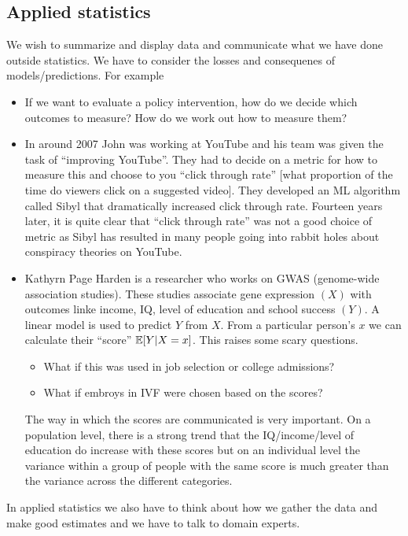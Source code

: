 \subsection{Applied statistics}
We wish to summarize and display data and communicate what we have done outside statistics. We have to consider the losses and consequenes of models/predictions. For example
\begin{itemize}
    \item If we want to evaluate a policy intervention, how do we decide which outcomes to measure? How do we work out how to measure them?
    \item In around 2007 John was working at YouTube and his team was given the task of ``improving YouTube''. They had to decide on a metric for how to measure this and choose to you ``click through rate'' [what proportion of the time do viewers click on a suggested video]. They developed an ML algorithm called Sibyl that dramatically increased click through rate. Fourteen years later, it is quite clear that ``click through rate'' was not a good choice of metric as Sibyl has resulted in many people going into rabbit holes about conspiracy theories on YouTube.
    \item Kathyrn Page Harden is a researcher who works on GWAS (genome-wide association studies). These studies associate gene expression $(X)$ with outcomes linke income, IQ, level of education and school success $(Y)$. A linear model is used to predict $Y$ from $X$. From a particular person's $x$ we can calculate their ``score'' ${\mathbb{E}}[Y|X = x]$. This raises some scary questions.
    \begin{itemize}
        \item What if this was used in job selection or college admissions?
        \item What if embroys in IVF were chosen based on the scores?
    \end{itemize}
    The way in which the scores are communicated is very important. On a population level, there is a strong trend that the IQ/income/level of education do increase with these scores but on an individual level the variance within a group of people with the same score is much greater than the variance across the different categories.
\end{itemize}
In applied statistics we also have to think about how we gather the data and make good estimates and we have to talk to domain experts.



